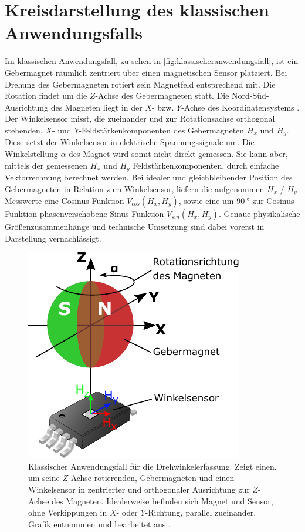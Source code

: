 %

\section{Kreisdarstellung des klassischen Anwendungsfalls}\label{sec:kreisdarstellung-anwendug}


Im klassischen Anwendungsfall, zu sehen in \autoref{fig:klassischeranwendungsfall}, ist ein Gebermagnet räumlich 
zentriert über einen magnetischen Sensor platziert. Bei Drehung des Gebermagneten rotiert sein Magnetfeld entsprechend 
mit. Die Rotation findet um die $Z$-Achse des Gebermagneten statt. Die Nord-Süd-Ausrichtung des Magneten liegt in der 
$X$- bzw. $Y$-Achse des Koordinatensystems \cite{NXPSemiconductors2014}\cite{TDK2016}.
\newline
Der Winkelsensor misst, die zueinander und zur Rotationsachse orthogonal stehenden, $X$- und $Y$-Feldstärkenkomponenten 
des Gebermagneten $H_x$ und $H_y$. Diese setzt der Winkelsensor in elektrische Spannungssignale um. Die Winkelstellung 
$\alpha$ des Magnet wird somit nicht direkt gemessen. Sie kann aber, mittels der gemessenen $H_x$ und $H_y$ 
Feldstärkenkomponenten, durch einfache Vektorrechnung berechnet werden.
\newline
Bei idealer und gleichbleibender Position des Gebermagneten in Relation zum Winkelsensor, liefern die aufgenommen 
$H_x$-/ $H_y$-Messwerte eine Cosinus-Funktion $V_{cos}(H_x,H_y)$, sowie eine um $\SI{90}{\degree}$ zur Cosinus-Funktion 
phasenverschobene Sinus-Funktion $V_{sin}(H_x,H_y)$. Genaue physikalische Größenzusammenhänge und technische Umsetzung 
sind dabei vorerst in Darstellung vernachlässigt. 


\clearpage


\begin{figure}[tph]
	\centering
	\includegraphics[width=0.35\linewidth]{chapters/images/2-Grundlagen/Klassischer_Anwendungsfall}
	\caption[Klassischer Anwendungsfall für die Drehwinkelerfassung]{Klassischer Anwendungsfall für die 
		Drehwinkelerfassung. Zeigt einen, um seine $Z$-Achse rotierenden, Gebermagneten und einen Winkelsensor in 
		zentrierter und orthogonaler Ausrichtung zur $Z$-Achse des Magneten. Idealerweise befinden sich Magnet und 
		Sensor, 
		ohne Verkippungen in $X$- oder $Y$-Richtung, parallel zueinander. Grafik entnommen und bearbeitet aus 
		\cite{Schuethe2020a}.}
	\label{fig:klassischeranwendungsfall}
\end{figure}



